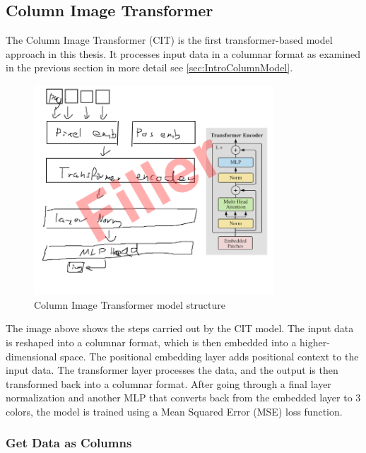 \subsection{Column Image Transformer}
    
    The Column Image Transformer (CIT) is the first transformer-based model approach in this thesis. It processes input data in a columnar format as examined in the previous section in more detail see \autoref{sec:IntroColumnModel}.


    \begin{figure}[H]
        \centering
        \includegraphics[width=0.8\textwidth]{imgs/CITModel.png}
        \caption{Column Image Transformer model structure}
        \label{fig:ColumnImageTransformer}
    \end{figure}

    The image above shows the steps carried out by the CIT model. The input data is reshaped into a columnar format, which is then embedded into a higher-dimensional space. The positional embedding layer adds positional context to the input data. The transformer layer processes the data, and the output is then transformed back into a columnar format. After going through a final layer normalization and another MLP that converts back from the embedded layer to 3 colors, the model is trained using a Mean Squared Error (MSE) loss function.

    \subsubsection{Get Data as Columns}

